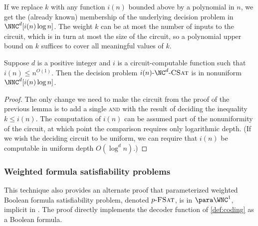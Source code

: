 If we replace $k$ with any function $i(n)$ bounded above by a polynomial in $n$, we get the (already known) membership of the underlying decision problem in $\NNC^d[i(n) \log n]$.
The weight $k$ can be at most the number of inputs to the circuit, which is in turn at most the size of the circuit, so a polynomial upper bound on $k$ suffices to cover all meaningful values of $k$.

\begin{corollary}\label{lem:nncmem}
  Suppose $d$ is a positive integer and $i$ is a circuit-computable function such that $i(n) \leq n^{O(1)}$.
  Then the decision problem $\iNCSAT$ is in nonuniform $\NNC^d[i(n) \log n]$.
\end{corollary}
\begin{proof}
  The only change we need to make the circuit from the proof of the previous lemma is to add a single \textsc{and} with the result of deciding the inequality $k \leq i(n)$.
  The computation of $i(n)$ can be assumed part of the nonuniformity of the circuit, at which point the comparison requires only logarithmic depth.
  (If we wish the deciding circuit to be uniform, we can require that $i(n)$ be computable in uniform depth $O(\log^d n)$.)
\end{proof}

\subsubsection{Weighted formula satisfiability problems}

This technique also provides an alternate proof that parameterized weighted Boolean formula satisfiability problem, denoted $p \textnormal{-} \textsc{FSat}$, is in $\para \WNC^1$, implicit in \autocite[Theorem~3.6]{est15}.
The proof directly implements the decoder function of \autoref{def:coding} as a Boolean formula.

